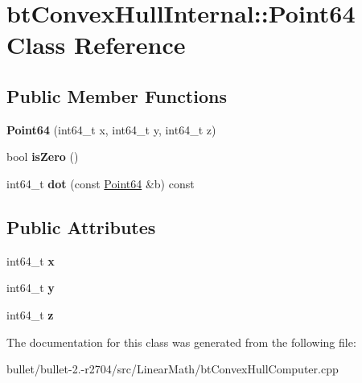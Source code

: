 \hypertarget{classbt_convex_hull_internal_1_1_point64}{\section{bt\+Convex\+Hull\+Internal\+:\+:Point64 Class Reference}
\label{classbt_convex_hull_internal_1_1_point64}
}
\subsection*{Public Member Functions}
\begin{DoxyCompactItemize}
\item 
\hypertarget{classbt_convex_hull_internal_1_1_point64_a723b59b7a54fdb1e711ccb73677f6c4e}{{\bfseries Point64} (int64\+\_\+t x, int64\+\_\+t y, int64\+\_\+t z)}\label{classbt_convex_hull_internal_1_1_point64_a723b59b7a54fdb1e711ccb73677f6c4e}

\item 
\hypertarget{classbt_convex_hull_internal_1_1_point64_a46c5f91fa82aae6e2c4799ac75b08a8e}{bool {\bfseries is\+Zero} ()}\label{classbt_convex_hull_internal_1_1_point64_a46c5f91fa82aae6e2c4799ac75b08a8e}

\item 
\hypertarget{classbt_convex_hull_internal_1_1_point64_af4bed7454634cfdc414c60623fecdf47}{int64\+\_\+t {\bfseries dot} (const \hyperlink{classbt_convex_hull_internal_1_1_point64}{Point64} \&b) const }\label{classbt_convex_hull_internal_1_1_point64_af4bed7454634cfdc414c60623fecdf47}

\end{DoxyCompactItemize}
\subsection*{Public Attributes}
\begin{DoxyCompactItemize}
\item 
\hypertarget{classbt_convex_hull_internal_1_1_point64_a58f0e47b63cd596d9b2d858245325650}{int64\+\_\+t {\bfseries x}}\label{classbt_convex_hull_internal_1_1_point64_a58f0e47b63cd596d9b2d858245325650}

\item 
\hypertarget{classbt_convex_hull_internal_1_1_point64_a3a3d2019def0c35d106f59b05c80d2ed}{int64\+\_\+t {\bfseries y}}\label{classbt_convex_hull_internal_1_1_point64_a3a3d2019def0c35d106f59b05c80d2ed}

\item 
\hypertarget{classbt_convex_hull_internal_1_1_point64_ad320c02bed91fcf3d239f3cbcbfb0961}{int64\+\_\+t {\bfseries z}}\label{classbt_convex_hull_internal_1_1_point64_ad320c02bed91fcf3d239f3cbcbfb0961}

\end{DoxyCompactItemize}


The documentation for this class was generated from the following file\+:\begin{DoxyCompactItemize}
\item 
bullet/bullet-\/2.-\/r2704/src/\+Linear\+Math/bt\+Convex\+Hull\+Computer.\+cpp\end{DoxyCompactItemize}
